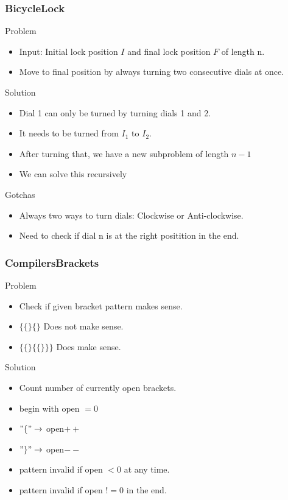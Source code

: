 \documentclass{beamer}
\begin{document}
\begin{frame}
    \frametitle{BicycleLock}
    \begin{block}{Problem}
        \begin{itemize}
            \item Input: Initial lock position $I$ and final lock position $F$ of length n.
            \item Move to final position by always turning two consecutive dials at once.
        \end{itemize}
    \end{block}
    \begin{block}{Solution}
        \begin{itemize}
            \item Dial 1 can only be turned by turning dials 1 and 2.
            \item It needs to be turned from $I_1$ to $I_2$.
            \item After turning that, we have a new subproblem of length $n-1$
            \item We can solve this recursively
        \end{itemize}
    \end{block}
    \begin{block}{Gotchas}
        \begin{itemize}
            \item Always two ways to turn dials: Clockwise or Anti-clockwise.
            \item Need to check if dial n is at the right positition in the end.
        \end{itemize}
    \end{block}
\end{frame}

\begin{frame}
    \frametitle{CompilersBrackets}
    \begin{block}{Problem}
        \begin{itemize}
            \item Check if given bracket pattern makes sense.
            \item $\{\{\}\{\}$ Does not make sense.
            \item $\{\{\}\{\{\}\}\}$ Does make sense.
        \end{itemize}
    \end{block}
    \begin{block}{Solution}
        \begin{itemize}
            \item Count number of currently open brackets.
            \item begin with open $= 0$
            \item $"\{" \rightarrow$ open$++$
            \item $"\}" \rightarrow$ open$--$
            \item pattern invalid if open $< 0$ at any time.
            \item pattern invalid if open $!= 0$ in the end.
        \end{itemize}
    \end{block}
\end{frame}
\end{document}
